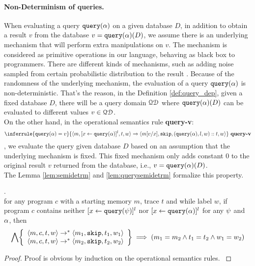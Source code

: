 \documentclass[a4paper,11pt]{article}
\begin{document}
\paragraph{Non-Determinism of queries.}
% 
{
When evaluating a query ${\tt query}(\alpha)$ on a given database $D$, 
in addition to obtain a result $v$ from the database $v = {\tt query}(\alpha)(D)$,
we assume there is an underlying mechanism that will perform extra manipulations on $v$. 
The mechanism is considered as primitive operations in our language, behaving as black box to programmers.
There are different kinds of mechanisms, 
such as adding noise sampled from certain probabilistic distribution to the result \cite{dwork2015preserving}.
Because of the randomness of the underlying mechanism, the evaluation of a query ${\tt query}(\alpha)$ is non-deterministic. 
That's the reason, in the Definition \ref{def:query_dep}, given a fixed database $D$, there will be a query domain $\mathcal{QD}$ where ${\tt query}(\alpha)(D) $ can be evaluated to different values $v \in \mathcal{QD}$.
}
\\
{
On the other hand, in the operational semantics rule \textbf{query-v}:
\[
		\inferrule
	{
	\query(\qval) = v
	}
	{
	\config{m, [\assign{x}{\query(\qval)}]^l, t, w} 
	\xrightarrow{} 
	\config{m[ v/ x], \eskip,  (\query(\qval), l, w) :: t,w }
	}
	~\textbf{query-v}
	\]
, we evaluate the query given database $D$ based on an assumption that the underlying mechanism is fixed.
This fixed mechanism only adds constant $0$ to the original result $v$ returned from the database, i.e., $v = {\tt query}(\alpha)(D)$. 
}
%
\\
%
The Lemma \ref{lem:semidetrm} and \ref{lem:querysemidetrm} formalize this property.
%
\begin{lem}
.
\label{lem:semidetrm}\\
{
for any program $c$ with a starting memory $m$, trace $t$ and while label $w$, 
if program $c$ contains neither  
$[\mathrel{ x \leftarrow {\tt query}(\psi) }]^l$ nor $[\mathrel{ x \leftarrow {\tt query}(\alpha) }]^l$ for any $\psi$ and $\alpha$, then
%
$$
\bigwedge
\left\{\begin{array}{l}
\config{m, c, t, w} 
\rightarrow^{*} 
\config{m_1, \eskip, t_1, w_1} 
\\ 
\config{m, c, t, w} 
\rightarrow^{*} 
\config{m_2, \eskip, t_2, w_2} 
\end{array}
\right\}
\implies
(m_1 = m_2 \land t_1 = t_2 \land w_1 = w_2)
 $$ 
}
\end{lem}
%
\begin{proof}
{
Proof is obvious by induction on the operational semantics rules.
}
\end{proof}
\end{document}
